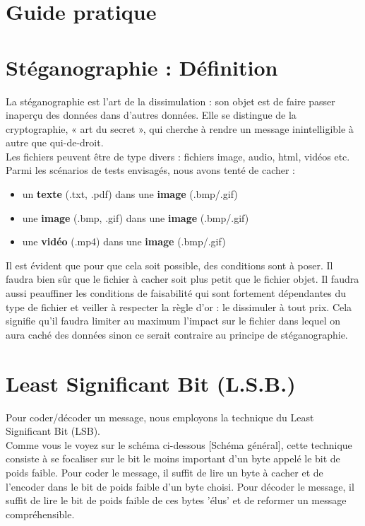 \vspace{1.5cm}
\section{Guide pratique}


\newpage
\section{Stéganographie : Définition}
La stéganographie est l'art de la dissimulation : son objet est de faire passer inaperçu des données dans d'autres données. 
Elle se distingue de la cryptographie, « art du secret », qui cherche à rendre un message inintelligible à autre que qui-de-droit.\\
Les fichiers peuvent être de type divers : fichiers image, audio, html, vidéos etc.\\
Parmi les scénarios de tests envisagés, nous avons tenté de cacher :\\

\begin{itemize}[label=$\diamond$, font=\LARGE \color{black}]
    \item un \textbf{texte} (.txt, .pdf) dans une \textbf{image} (.bmp/.gif)
    \item une \textbf{image} (.bmp, .gif) dans une \textbf{image} (.bmp/.gif)
    \item une \textbf{vidéo} (.mp4) dans une \textbf{image} (.bmp/.gif)\\
\end{itemize}


Il est évident que pour que cela soit possible, des conditions sont à poser.
Il faudra bien sûr que le fichier à cacher soit plus petit que le fichier objet. Il faudra aussi peauffiner les conditions de 
faisabilité qui sont fortement dépendantes du type de fichier et veiller à respecter la règle d'or : le dissimuler à tout prix.
Cela signifie qu'il faudra limiter au maximum l'impact sur le fichier dans lequel on aura caché des données sinon ce serait contraire
au principe de stéganographie.


\newpage
\section{Least Significant Bit (L.S.B.)}
Pour coder/décoder un message, nous employons la technique du Least Significant Bit (LSB). \\
Comme vous le voyez sur le schéma ci-dessous [Schéma général], cette technique consiste à se focaliser sur le bit le moins 
important d'un byte appelé le bit de poids faible.
Pour coder le message, il suffit de lire un byte à cacher et de l'encoder dans le bit de poids faible d'un byte choisi.
Pour décoder le message, il suffit de lire le bit de poids faible de ces bytes 'élus' et de reformer un message compréhensible.\\\\


